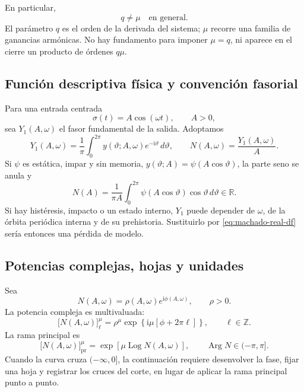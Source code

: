 En particular,
\begin{equation}
 q\neq\mu\quad\text{en general}.
 \label{eq:q-not-mu}
\end{equation}
El parámetro \(q\) es el orden de la derivada del sistema; \(\mu\) recorre una
familia de ganancias armónicas. No hay fundamento para imponer \(\mu=q\), ni
aparece en el cierre un producto de órdenes \(q\mu\).

\subsection{Función descriptiva física y convención fasorial}

Para una entrada centrada
\[
 \sigma(t)=A\cos(\omega t),\qquad A>0,
\]
sea \(Y_1(A,\omega)\) el fasor fundamental de la salida. Adoptamos
\begin{equation}
 Y_1(A,\omega)
 =\frac{1}{\pi}\int_{0}^{2\pi}
 y(\vartheta;A,\omega)e^{-\mathrm i\vartheta}\,d\vartheta,
 \qquad
 N(A,\omega)=\frac{Y_1(A,\omega)}{A}.
 \label{eq:machado-classical-df}
\end{equation}
Si \(\psi\) es estática, impar y sin memoria,
\(y(\vartheta;A)=\psi(A\cos\vartheta)\), la parte seno se anula y
\begin{equation}
 N(A)=\frac{1}{\pi A}\int_{0}^{2\pi}
 \psi(A\cos\vartheta)\cos\vartheta\,d\vartheta\in\mathbb R.
 \label{eq:machado-real-df}
\end{equation}
Si hay histéresis, impacto o un estado interno, \(Y_1\) puede depender de
\(\omega\), de la órbita periódica interna y de su prehistoria. Sustituirlo por
\cref{eq:machado-real-df} sería entonces una pérdida de modelo.

\subsection{Potencias complejas, hojas y unidades}

Sea
\[
 N(A,\omega)=\rho(A,\omega)e^{\mathrm i\phi(A,\omega)},
 \qquad \rho>0.
\]
La potencia compleja es multivaluada:
\begin{equation}
 \bigl[N(A,\omega)\bigr]_{\ell}^{\mu}
 =\rho^\mu
 \exp\!\left\{\mathrm i\mu[\phi+2\pi\ell]\right\},
 \qquad \ell\in\mathbb Z.
 \label{eq:machado-multivalued}
\end{equation}
La rama principal es
\begin{equation}
 \bigl[N(A,\omega)\bigr]_{\mathrm{pr}}^{\mu}
 =\exp\!\left[\mu\operatorname{Log}N(A,\omega)\right],
 \qquad \operatorname{Arg}N\in(-\pi,\pi].
 \label{eq:machado-principal}
\end{equation}
Cuando la curva cruza \(( -\infty,0]\), la continuación requiere desenvolver la
fase, fijar una hoja y registrar los cruces del corte, en lugar de aplicar la
rama principal punto a punto.

